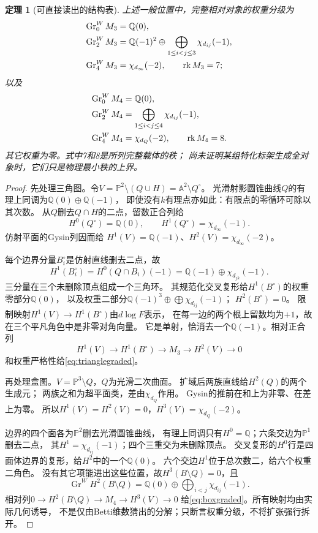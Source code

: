 \documentclass[11pt,a4paper]{ctexart}
\theoremstyle{cnplain}\newtheorem{theorem}{定理}[section]
\theoremstyle{definition}\newtheorem{definition}[theorem]{定义}
\theoremstyle{remark}\newtheorem{remark}[theorem]{注}
\newcommand{\Q}{\mathbb Q}\newcommand{\cC}{\mathcal C}
\newcommand{\rk}{\operatorname{rk}}\newcommand{\im}{\operatorname{im}}
\begin{document}
\begin{theorem}[可直接读出的结构表]\label{thm:onegraded}
上述一般位置中，完整相对对象的权重分级为
\begin{align}\label{eq:trianglegraded}
 \operatorname{Gr}^W_0M_3&=\Q(0),\notag\\
 \operatorname{Gr}^W_2M_3&=\Q(-1)^2\oplus
                 \bigoplus_{1\le i<j\le3}\chi_{d_{ij}}(-1),\notag\\
 \operatorname{Gr}^W_4M_3&=\chi_{d_\infty}(-2),
 \qquad \rk M_3=7;
\end{align}
以及
\begin{align}\label{eq:boxgraded}
 \operatorname{Gr}^W_0M_4&=\Q(0),\notag\\
 \operatorname{Gr}^W_2M_4&=\bigoplus_{1\le i<j\le4}\chi_{d_{ij}}(-1),\notag\\
 \operatorname{Gr}^W_4M_4&=\chi_{d_Q}(-2),
 \qquad \rk M_4=8.
\end{align}
其它权重为零。式中7和8是所列\emph{完整载体}的秩；
尚未证明某组特化标架生成全对象时，它们只是物理最小秩的上界。
\end{theorem}
\begin{proof}
先处理三角图。令$V=\mathbb P^2\setminus(Q\cup H)=\mathbb A^2\setminus Q^\circ$。
光滑射影圆锥曲线$Q$的有理上同调为$\Q(0)\oplus\Q(-1)$，
即使没有$k$有理点亦如此：有限点的零循环可除以其次数。
从$Q$删去$Q\cap H$的二点，留数正合列给
\[
 H^0(Q^\circ)=\Q(0),\qquad H^1(Q^\circ)=\chi_{d_\infty}(-1).
\]
仿射平面的Gysin列因而给
$H^1(V)=\Q(-1)$、$H^2(V)=\chi_{d_\infty}(-2)$。

每个边界分量$B_i^\circ$是仿射直线删去二点，故
\[
 H^1(B_i^\circ)=H^0(Q\cap B_i)(-1)
               =\Q(-1)\oplus\chi_{d_{jk}}(-1).
\]
三分量在三个未删除顶点组成一个三角环。
其规范化交叉复形给$H^1(B^\circ)$的权重零部分$\Q(0)$，
以及权重二部分$\Q(-1)^3\oplus\bigoplus\chi_{d_{ij}}(-1)$；
$H^2(B^\circ)=0$。
限制映射$H^1(V)\to H^1(B^\circ)$由$d\log F$表示，
在每一边的两个根上留数均为$+1$，故在三个平凡角色中是非零对角向量。
它是单射，恰消去一个$\Q(-1)$。相对正合列
\[
 H^1(V)\longrightarrow H^1(B^\circ)\longrightarrow M_3
            \longrightarrow H^2(V)\longrightarrow0
\]
和权重严格性给\eqref{eq:trianglegraded}。

再处理盒图。$V=\mathbb P^3\setminus Q$，$Q$为光滑二次曲面。
扩域后两族直线给$H^2(Q)$的两个生成元；
两族之和为超平面类，差由$\chi_{d_Q}$作用。
Gysin的推前在和上为非零、在差上为零。
所以$H^1(V)=H^2(V)=0$，$H^3(V)=\chi_{d_Q}(-2)$。

边界的四个面各为$\mathbb P^2$删去光滑圆锥曲线，
有理上同调只有$H^0=\Q$；六条交边为$\mathbb P^1$删去二点，
其$H^1=\chi_{d_{ij}}(-1)$；四个三重交为未删除顶点。
交叉复形的$H^0$行是四面体边界的复形，给$H^2$中的一个$\Q(0)$。
六个交边$H^1$位于总次数二，给六个权重二角色。
没有其它项能进出这些位置，故$H^3(B\setminus Q)=0$，且
\[
 \operatorname{Gr}^W H^2(B\setminus Q)
   =\Q(0)\oplus\bigoplus_{i<j}\chi_{d_{ij}}(-1).
\]
相对列$0\to H^2(B\setminus Q)\to M_4\to H^3(V)\to0$
给\eqref{eq:boxgraded}。所有映射均由实际几何诱导，
不是仅由Betti维数猜出的分解；只断言权重分级，不将扩张强行拆开。
\end{proof}
\end{document}
